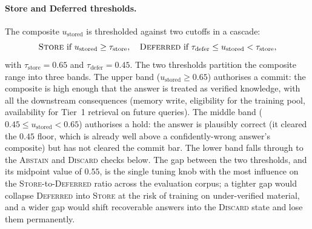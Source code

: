 \paragraph{Store and Deferred thresholds.}
The composite $u_{\text{stored}}$ is thresholded against two cutoffs in a cascade:
\begin{equation}
\textsc{Store} \text{ if } u_{\text{stored}} \geq \tau_{\text{store}}, \quad
\textsc{Deferred} \text{ if } \tau_{\text{defer}} \leq u_{\text{stored}} < \tau_{\text{store}},
\label{eq:store-defer}
\end{equation}
with $\tau_{\text{store}} = 0.65$ and $\tau_{\text{defer}} = 0.45$. The two thresholds partition the composite range into three bands. The upper band ($u_{\text{stored}} \geq 0.65$) authorises a commit: the composite is high enough that the answer is treated as verified knowledge, with all the downstream consequences (memory write, eligibility for the training pool, availability for Tier~1 retrieval on future queries). The middle band ($0.45 \leq u_{\text{stored}} < 0.65$) authorises a hold: the answer is plausibly correct (it cleared the $0.45$ floor, which is already well above a confidently-wrong answer's composite) but has not cleared the commit bar. The lower band falls through to the \textsc{Abstain} and \textsc{Discard} checks below. The gap between the two thresholds, and its midpoint value of $0.55$, is the single tuning knob with the most influence on the \textsc{Store}-to-\textsc{Deferred} ratio across the evaluation corpus; a tighter gap would collapse \textsc{Deferred} into \textsc{Store} at the risk of training on under-verified material, and a wider gap would shift recoverable answers into the \textsc{Discard} state and lose them permanently.

